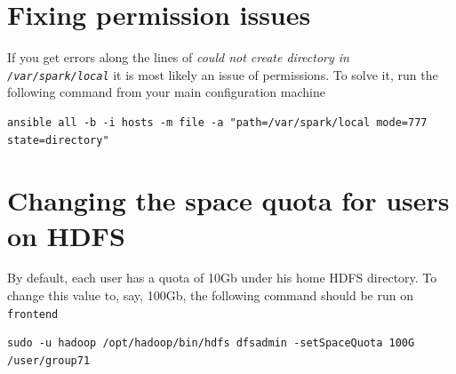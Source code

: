 \documentclass[justified]{tufte-handout}
\begin{document}
\section{Fixing permission issues}

If you get errors along the lines of \emph{could not create directory in \lstinline{/var/spark/local}}
it is most likely an issue of permissions. To solve it, run the following command from your main configuration machine

\begin{verbatim}
ansible all -b -i hosts -m file -a "path=/var/spark/local mode=777 state=directory"
\end{verbatim}

\section{Changing the space quota for users on HDFS}

By default, each user has a quota of 10Gb under his home HDFS directory.
To change this value to, say, 100Gb, the following command should be run on \lstinline{frontend} 

\begin{verbatim}
sudo -u hadoop /opt/hadoop/bin/hdfs dfsadmin -setSpaceQuota 100G /user/group71
\end{verbatim}
\end{document}

